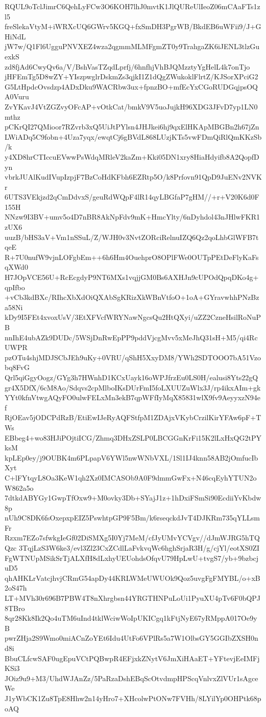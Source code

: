 RQUL9oTclJimrC6QehLyFCw3O6KOH7lhJ0mvtK1JlQUReUlIeoZ06mCAaFTs1zl5
freSlekaVtyM+iWRXcUQ6GWrv5KGQ+fxSmDH3PgrWB/BkdEB6uWFii9/J+GHiNdL
jW7w/Q1Fl6UgguPNVXEZ4wza2qgmmMLMFgmZT0y9TrahgaZK6iJENL3tlzGuexkS
zd8fjAd6CwyQv6a/V/BshVasTZqdLprfj/6hnfhjVhBJQMzztyYgHelL4k7onTjo
jHFEmTg5D8wZY+YIszpwglrDskmZs3qjkI1Z1dQgZWukoklFlrtZ/KJSorXPciG2
G5LtHpdcOvsdzp4ADxDku9WACRbw3ux+fpnzBO+mfEcYxCGoRUDGqjpsOQA0Vuru
ZvYKavJ4VtZGZvyOFcAP+vOtkCat/bmkV9V5uoJujkH96XDG3JFvD7yp1LN0mthz
pCKrQI27QMioor7RZvrb3xQ5UiJtPYlsn4JHJkei6hj9qxElHKApMBGBn2h67jZn
LWiADq5C9fobn+4Uza7yqx/ewqtCj6gBVdL868LUzjKTs5vwFDmQiRlQmKKzSb/k
y4XD8hrCTIccuEVwwPsWdqMRleV2kaZm+Kki05DN1xry8HiaHdyifb8A2QopfDyn
vbrkJUAlKudIVupIzpjF7BzCoHdKFbh6EZRtp5O/k8Prfovn91QpD9JuENv2NVKr
6UTS3VEkjzd2qCmDdvxS/geuRdWQpF4lR14qyLBGfaP7gHM//+r+V20K6d0F155H
NNzw9I3BV+umv5o4D7nBR8AkNpFdv9mK+HmcYlty/6nDyhdol43nJHlwFKR1zUX6
uuzB/bHS3aV+Vm1nSSuL/Z/WJH0v3NvtZORciRelnuIZQ6Qz2qoLhbGlWFB7tqeE
R+7U0nufW9vjnLOFgbEm++6h6Hm4OuehprO8OPlFWe0OUTpPEtDeFlyKaFsqXWd0
H7JOpVCE56U+RcEcgdyP9NT6MXs1vqjjGM0Bs6AXHJn9cUPOdQpqDKo4g+qpIfbo
+vCb3kdBXc/RIhcXbXdOiQXAbSgKRizXkWBnVtfoO+1oA+GYravwhhPNzBza58Ni
kDy9I5FEt4xvoxUsV/3EtXFVcfWRYNawNgcsQu2HtQXyi/uZZ2CzneHsilRoNuPB
nnIhE4ubAZk9DUDc/5WSjDnRwEpPP9pddVjcgMvv5xMeJhQ31sH+M5/qi4RcUWPR
pzOTu4shjMDJSCbJEh9uKy+0VRU/qShH5XxyDM8/YWh2SDTOOO7bA51Vzobq8FvG
Qrl5qiGgyOogz/GYg3h7HWnhD1KCxUayk16oWPJfrzEu0LS0H/ealusi8Yts22gQ
gr4X5DfX/6cM8Ao/Sdqvs2cpMlboIKsDUrFmI5foLXUUZuWlx3J/rp4ikxAIm+gk
YYt0kfnVtwgAQyFO0ulwFELxMn3ekB7qpWFfIyMqX85831wlX9fv9AeyyxzN94ef
RjOEav5jODCPdRzB/EtiEwIJeRyAQFStfpM1ZDAjxVKybCrzilKirYFAw6pF+TWs
EBbeg4+wo83HJiPOjtiICG/Zhmq3DHxZSLP0LBCGGnKrFi15K2lLxHxQG2tPYksM
kpLEp0ey/j9OUBK4m6PLpapV6YWl5nwWNbVXL/1Sl1IJ4knn58AB2jOmfucIbXyt
C+lFYtqyL8Oa3KeW1qh2Xz0IMCASOb9A0F9dmmGwFx+N46cqEyhYTUN2oW862a5o
7dtkdABYGy1GwpTfOxw9+M0ovky3Db+SYajJ1z+1hDxiFSmSi90EcdiiYvKbdw8p
nUh9C8DK6fsOxepxpEIZ5PswhtpGP9F5Bm/k6rseqckdJvT4DJKRm735qYLLsmFr
Rzxm7EZo7sfwkgIeGf02DiSMXg5I0Yj7MeM/cfJyUMvYCVgv//dJmWJRG5hTQQzc
3TqjLzS3W6ke3/evl3Zl23CxZCdlLaFvkvqWc6hghSrjaR3H/g/cjYl/eotXS0ZI
FgWTNUpMSikSrTjALXfH8dLxhyUEUohdsOfqvU79HpLwU+tvgS7/yb+9bzbcjuD5
qhAHKLrVatcjhvjCRmG54apDy44KRLWMeUWUOk9Qoz5uvgFgFMYBL/o+xB2oS47h
LT+MVh30r696B7PBW4T8nXhrgbsn44YRGTHNPuLoUi1PyuXU4pTv6F0bQPJ8TBro
8qr28Kk8Ik2Qo4uTM6uInd4tklWciwWoIpUKICgq1kFtjNyE67yRMppA017Oe9yB
pwrZHja2S9Wmo0miACnZoYEt6Idu4UtFo6VPlRs5a7W1OlbsGY5GGIbZXSH0nd8i
BbuCLfcwSAF0ugEpuVCtPQBwpR4EFjxkZNytV6JmXiHAaET+YFtevjEeIMFjKSi3
JOiz9u9+M3/UhdWJAnZz/5PaRzaDshEBqScOtvdmpHPScqVnlvxZlVUr1sAgceWe
J1yWbCK1Zu8TpE8Hhw2n14yHro7+XHcolwPtONw7FVHh/8LYilYp0OHPtk68poAQ
